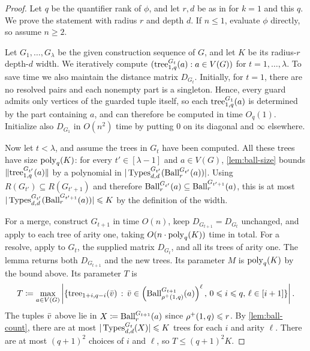 {\renewcommand{\mcdepth}{d}\mcthm*}
\begin{proof}
Let $q$ be the quantifier rank of $\phi$, and let $r,d$ be as in
 for $k=1$ and this $q$.  We prove the statement
with radius $r$ and depth $d$.
If $n\le1$, evaluate $\phi$ directly, so assume $n\ge2$.

Let $G_1,\ldots,G_\lambda$ be the given
construction sequence of $G$, and let $K$ be its radius-$r$ depth-$d$
width.  We iteratively compute $(\mathrm{tree}^{G_t}_{1,q}(a):a\in V(G))$ for $t=1,\ldots,\lambda$. To save time we also maintain the distance matrix $D_{G_t}$.
Initially, for \(t=1\), there are no resolved pairs and each nonempty part is a singleton.
Hence, every guard admits only vertices of the guarded tuple itself, so
each \(\mathrm{tree}^{G_1}_{1,q}(a)\) is determined by the part containing \(a\), and can therefore be computed in time \(O_q(1)\).
Initialize also $D_{G_1}$ in $O(n^2)$ time by putting $0$ on its diagonal and $\infty$ elsewhere.

Now let \(t<\lambda\), and assume the trees in $G_t$ have been computed.
All these trees have size $\mathrm{poly}_{q}(K)$: for every $t'\in[\lambda-1]$
and $a\in V(G)$, \ref{lem:ball-size} bounds
$\lVert \mathrm{tree}^{G_{t'}}_{1,q}(a)\rVert$ by a polynomial in
$|\operatorname{Types}^{G_{t'}}_{d,d}(\operatorname{Ball}^{G_{t'}}_{r}(a))|$.  Using $R(G_{t'})\subseteq R(G_{t'+1})$
and therefore $\operatorname{Ball}^{G_{t'}}_r(a)\subseteq \operatorname{Ball}^{G_{t'+1}}_r(a)$, this is at most
$|\operatorname{Types}^{G_{t'}}_{d,d}(\operatorname{Ball}^{G_{t'+1}}_{r}(a))|\leqslant K$ by the definition of
the width.


For a merge, construct $G_{t+1}$ in time $O(n)$, keep $D_{G_{t+1}}=D_{G_t}$ unchanged, and apply  to each tree of arity one, taking $O(n\cdot\mathrm{poly}_q(K))$ time in total.
For a resolve, apply  to $G_t$, the supplied matrix $D_{G_t}$, and all its trees of arity one. The lemma returns both $D_{G_{t+1}}$ and the new trees.
Its parameter $M$ is $\mathrm{poly}_q(K)$ by the bound above.
Its parameter $T$ is
$$T\coloneqq \max_{a\in V(G)}\left|\{\mathrm{tree}_{1+i,q-i}(\bar v) \,:\, \bar v\in \left(\operatorname{Ball}^{G_{t+1}}_{\rho^+(1,q)}(a)\right)^\ell,\,  0\leqslant i\leqslant q,\, \ell\in [i+1] \}\right|.$$
The tuples $\bar v$ above lie in $X\coloneqq\operatorname{Ball}^{G_{t+1}}_r(a)$ since $\rho^+(1,q)\leqslant r$.
By \ref{lem:ball-count}, there are at most $|\operatorname{Types}^{G_t}_{d,d}(X)|\leqslant K$ trees for each $i$ and arity $\ell$.
There are at most $(q+1)^2$ choices of $i$ and $\ell$, so $T\le(q+1)^2K$.


\end{proof}
